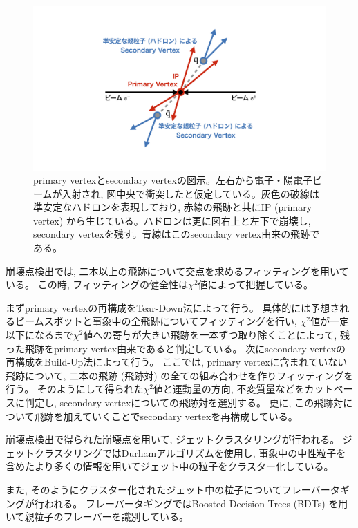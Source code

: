 \begin{figure}[htbp]
 \centering
 \includegraphics[trim = 0 100 0 50, width=1.0\textwidth, clip]{Figure/1Introduction/6ReconstructedVertex.png}
 \caption[primary vertexとsecondary vertexの図示]{primary vertexとsecondary vertexの図示。左右から電子・陽電子ビームが入射され, 図中央で衝突したと仮定している。灰色の破線は準安定なハドロンを表現しており, 赤線の飛跡と共にIP (primary vertex) から生じている。ハドロンは更に図右上と左下で崩壊し, secondary vertexを残す。青線はこのsecondary vertex由来の飛跡である。}
 \label{6ReconstructedVertex}
\end{figure}

崩壊点検出では, 二本以上の飛跡について交点を求めるフィッティングを用いている。
この時, フィッティングの健全性は$\chi^2$値によって把握している。

まずprimary vertexの再構成をTear-Down法によって行う。
具体的には予想されるビームスポットと事象中の全飛跡についてフィッティングを行い, $\chi^2$値が一定以下になるまで$\chi^2$値への寄与が大きい飛跡を一本ずつ取り除くことによって, 残った飛跡をprimary vertex由来であると判定している。
次にsecondary vertexの再構成をBuild-Up法によって行う。
ここでは, primary vertexに含まれていない飛跡について, 二本の飛跡 (飛跡対) の全ての組み合わせを作りフィッティングを行う。
そのようにして得られた$\chi^2$値と運動量の方向, 不変質量などをカットベースに判定し, secondary vertexについての飛跡対を選別する。
更に, この飛跡対について飛跡を加えていくことでsecondary vertexを再構成している。


崩壊点検出で得られた崩壊点を用いて, ジェットクラスタリングが行われる。
ジェットクラスタリングではDurhamアルゴリズム\cite{Durhampaper}を使用し, 事象中の中性粒子を含めたより多くの情報を用いてジェット中の粒子をクラスター化している。

また, そのようにクラスター化されたジェット中の粒子についてフレーバータギングが行われる。
フレーバータギングではBoosted Decision Trees (BDTs) を用いて親粒子のフレーバーを識別している。

